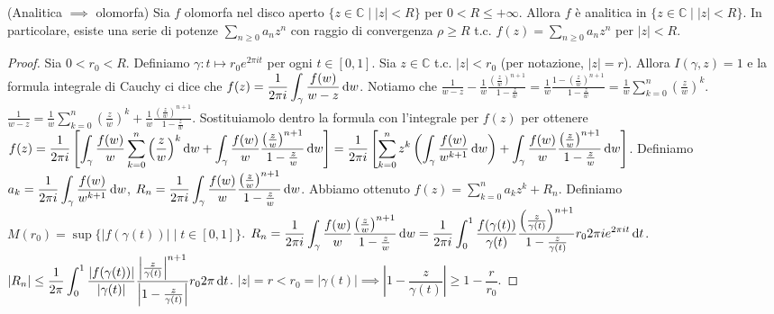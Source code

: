 \begin{thm}
  (Analitica $\implies$ olomorfa) Sia $f$ olomorfa nel disco aperto $\{z \in \mathbb{C} \mid |z|<R\}$ per $0<R\le+\infty$. Allora $f$ è analitica in $\{z \in \mathbb{C} \mid |z|<R\}$. In particolare, esiste una serie di potenze $\displaystyle \sum_{n \ge 0} a_nz^n$ con raggio di convergenza $\rho \ge R$ t.c. $\displaystyle f(z)=\sum_{n \ge 0} a_nz^n$ per $|z|<R$.
\end{thm}

\begin{proof}
  Sia $0<r_0<R$. Definiamo $\gamma:t \longmapsto r_0e^{2\pi i t}$ per ogni $t \in [0,1]$. Sia $z \in \mathbb{C}$ t.c. $|z|<r_0$ (per notazione, $|z|=r$). Allora $I(\gamma,z)=1$ e la formula integrale di Cauchy ci dice che $\displaystyle f(z)=\dfrac{1}{2\pi i}\int_{\gamma}\frac{f(w)}{w-z}\mathop{}\!\mathrm{d} w$.
  Notiamo che $\displaystyle \frac{1}{w-z}-\frac{1}{w}\frac{\left(\frac{z}{w}\right)^{n+1}}{1-\frac{z}{w}}=\frac{1}{w}\frac{1-\left(\frac{z}{w}\right)^{n+1}}{1-\frac{z}{w}}=\frac{1}{w}\sum_{k=0}^n \left(\frac{z}{w}\right)^k$.
  $\displaystyle \frac{1}{w-z}=\frac{1}{w}\sum_{k=0}^n \left(\frac{z}{w}\right)^k+\frac{1}{w}\frac{\left(\frac{z}{w}\right)^{n+1}}{1-\frac{z}{w}}$.
  Sostituiamolo dentro la formula con l'integrale per $f(z)$ per ottenere $\displaystyle f(z)=\frac{1}{2\pi i}\left[\int_{\gamma}\frac{f(w)}{w}\sum_{k=0}^n \left(\frac{z}{w}\right)^k\mathop{}\!\mathrm{d} w+\int_{\gamma}\frac{f(w)}{w}\frac{\left(\frac{z}{w}\right)^{n+1}}{1-\frac{z}{w}}\mathop{}\!\mathrm{d} w\right]=\frac{1}{2\pi i}\left[\sum_{k=0}^n z^k\left(\int_{\gamma} \frac{f(w)}{w^{k+1}}\mathop{}\!\mathrm{d} w\right)+\int_{\gamma}\frac{f(w)}{w}\frac{\left(\frac{z}{w}\right)^{n+1}}{1-\frac{z}{w}}\mathop{}\!\mathrm{d} w\right]$.
  Definiamo $\displaystyle a_k=\frac{1}{2\pi i}\int_{\gamma} \frac{f(w)}{w^{k+1}}\mathop{}\!\mathrm{d} w$, $\displaystyle R_n=\frac{1}{2\pi i}\int_{\gamma}\frac{f(w)}{w}\frac{\left(\frac{z}{w}\right)^{n+1}}{1-\frac{z}{w}}\mathop{}\!\mathrm{d} w$.
  Abbiamo ottenuto $\displaystyle f(z)=\sum_{k=0}^n a_kz^k+R_n$. Definiamo $M(r_0)=\sup\{|f(\gamma(t))| \mid t \in [0,1]\}$.
  $\displaystyle R_n=\frac{1}{2\pi i}\int_{\gamma}\frac{f(w)}{w}\frac{\left(\frac{z}{w}\right)^{n+1}}{1-\frac{z}{w}}\mathop{}\!\mathrm{d} w=\frac{1}{2\pi i}\int_0^1 \frac{f(\gamma(t))}{\gamma(t)}\frac{\left(\frac{z}{\gamma(t)}\right)^{n+1}}{1-\frac{z}{\gamma(t)}}r_02\pi ie^{2\pi it}\mathop{}\!\mathrm{d} t$.
  $\displaystyle |R_n| \le \frac{1}{2\pi}\int_0^1 \frac{|f(\gamma(t))|}{|\gamma(t)|}\frac{\left|\frac{z}{\gamma(t)}\right|^{n+1}}{\left|1-\frac{z}{\gamma(t)}\right|}r_02\pi \mathop{}\!\mathrm{d} t$.
  $|z|=r<r_0=|\gamma(t)| \implies \left|1-\dfrac{z}{\gamma(t)}\right| \ge 1-\dfrac{r}{r_0}$.

\end{proof}

